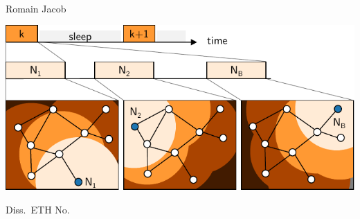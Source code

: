 
\thispagestyle{empty}


\newlength{\savedoddsidemargin}
\setlength{\savedoddsidemargin}{\oddsidemargin}
\setlength{\oddsidemargin}{1in}


{\sffamily\setlength{\baselineskip}{9mm}
~
\vfill

{
\LARGE\bfseries
\titlestring
}

\vspace{0.5in}

{\Large
Romain Jacob
}

\vspace{0.8in}

\includegraphics[scale=1]{Cover/cover_image}

\vspace{0.8in}

{\Large
Diss.\ ETH No.\ \dissnumstring
}

}

\clearpage

\setlength{\oddsidemargin}{\savedoddsidemargin}

\clearpage
